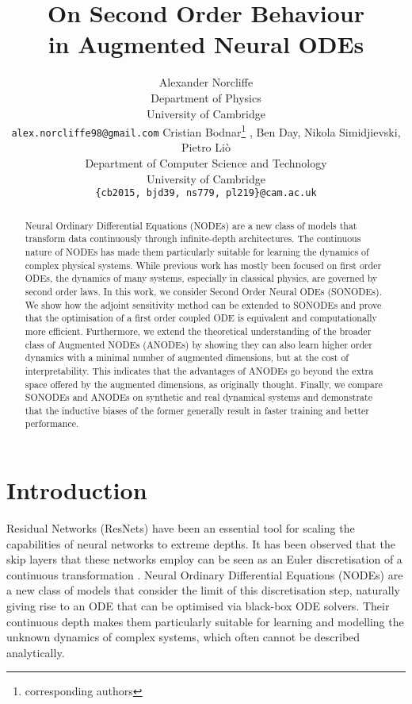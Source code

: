 \documentclass{article}
\title{On Second Order Behaviour\\in Augmented Neural ODEs}
\author{Alexander Norcliffe \\
  Department of Physics \\
  University of Cambridge \\
  \texttt{alex.norcliffe98@gmail.com}
\And
  Cristian Bodnar\thanks{corresponding authors} , Ben Day\footnotemark[1] , Nikola Simidjievski, Pietro Li\`o \\
  Department of Computer Science and Technology \\
  University of Cambridge \\
  \texttt{\{cb2015, bjd39, ns779, pl219\}@cam.ac.uk}
}
\theoremstyle{remark}
\theoremstyle{definition}
\begin{document}
\maketitle

\begin{abstract}
Neural Ordinary Differential Equations (NODEs) are a new class of models that transform data continuously through infinite-depth architectures. The continuous nature of NODEs has made them particularly suitable for learning the dynamics of complex physical systems. While previous work has mostly been focused on first order ODEs, the dynamics of many systems, especially in classical physics, are governed by second order laws. In this work, we consider Second Order Neural ODEs (SONODEs). We show how the adjoint sensitivity method can be extended to SONODEs and prove that the optimisation of a first order coupled ODE is equivalent and computationally more efficient. Furthermore, we extend the theoretical understanding of the broader class of Augmented NODEs (ANODEs) by showing they can also learn higher order dynamics with a minimal number of augmented dimensions, but at the cost of interpretability. This indicates that the advantages of ANODEs go beyond the extra space offered by the augmented dimensions, as originally thought. Finally, we compare SONODEs and ANODEs on synthetic and real dynamical systems and demonstrate that the inductive biases of the former generally result in faster training and better performance.  
\end{abstract}


\section{Introduction}
Residual Networks (ResNets) \cite{he2015deep} have been an essential tool for scaling the capabilities of neural networks to extreme depths. It has been observed that the skip layers that these networks employ can be seen as an Euler discretisation of a continuous transformation \citep{lu2017finite, Haber_2017, ruthotto2019deep}. Neural Ordinary Differential Equations (NODEs) \citep{chen2018neural} are a new class of models that consider the limit of this discretisation step, naturally giving rise to an ODE that can be optimised via black-box ODE solvers. Their continuous depth makes them particularly suitable for learning and modelling the unknown dynamics of complex systems, which often cannot be described analytically. 
\end{document}
